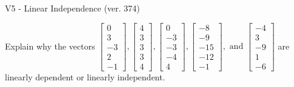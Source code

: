 \begin{exercise}
  \begin{exerciseTitle}V5 - Linear Independence (ver. 374)\end{exerciseTitle}
  \begin{exerciseStatement}
    Explain why the vectors \(\left[\begin{array}{r}
0 \\
3 \\
-3 \\
2 \\
-1
\end{array}\right] , \left[\begin{array}{r}
4 \\
3 \\
3 \\
3 \\
4
\end{array}\right] , \left[\begin{array}{r}
0 \\
-3 \\
-3 \\
-4 \\
4
\end{array}\right] , \left[\begin{array}{r}
-8 \\
-9 \\
-15 \\
-12 \\
-1
\end{array}\right] , \text{ and } \left[\begin{array}{r}
-4 \\
3 \\
-9 \\
1 \\
-6
\end{array}\right]\) are linearly dependent or linearly independent.	



\end{exerciseStatement}
\end{exercise}

